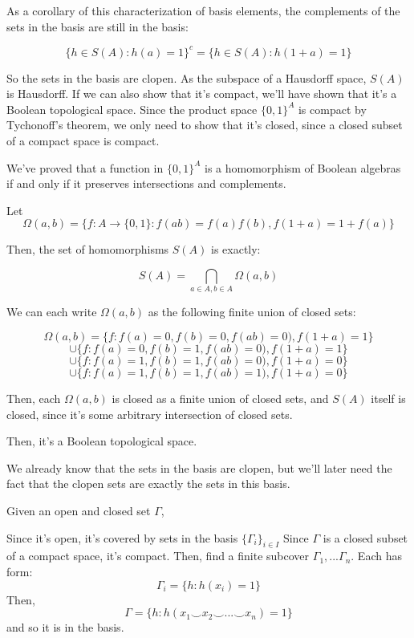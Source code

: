 \documentclass{article}
\begin{document}
      As a corollary of this characterization of basis elements, the complements
      of the sets in the basis are still in the basis:

      \[\{h \in S(A) : h(a) = 1\}^c = \{h \in S(A) : h(1+a) = 1\}\]

      So the sets in the basis are clopen.  As the subspace of a Hausdorff
      space, $S(A)$ is Hausdorff.  If we can also show that it's compact, we'll
      have shown that it's a Boolean topological space.  Since the product space
      $\{0,1\}^A$ is compact by Tychonoff's theorem, we only need to show that
      it's closed, since a closed subset of a compact space is compact.

      We've proved that a function in $\{0,1\}^A$ is a homomorphism of Boolean
      algebras if and only if it preserves intersections and complements.

      Let \[\Omega(a,b) = \{ f: A \rightarrow \{0,1\} : f(ab) = f(a)f(b), f(1+a)
      = 1 + f(a)\}\]

      Then, the set of homomorphisms $S(A)$ is exactly:

      \[S(A) = \bigcap_{a \in A, b \in A} \Omega(a,b)\]

      We can each write $\Omega(a,b)$ as the following finite union of closed
      sets:

      \[\Omega(a,b) = \{f : f(a) = 0, f(b) = 0, f(ab) = 0), f(1+a) = 1\}\]
      \[\cup \{f : f(a) = 0, f(b) = 1, f(ab) = 0), f(1+a) = 1\}\] \[\cup \{f :
      f(a) = 1, f(b) = 1, f(ab) = 0), f(1+a) = 0\}\] \[\cup \{f : f(a) = 1, f(b)
      = 1, f(ab) = 1), f(1+a) = 0\}\]

      Then, each $\Omega(a,b)$ is closed as a finite union of closed sets, and
      $S(A)$ itself is closed, since it's some arbitrary intersection of closed
      sets.

      Then, it's a Boolean topological space.

      We already know that the sets in the basis are clopen, but we'll later
      need the fact that the clopen sets are exactly the sets in this basis.

      Given an open and closed set $\Gamma$,

      Since it's open, it's covered by sets in the basis $\{\Gamma_i\}_{i \in
      I}$ Since $\Gamma$ is a closed subset of a compact space, it's compact.
      Then, find a finite subcover $\Gamma_1, ... \Gamma_n$. Each has form:
      \[\Gamma_i = \{h: h(x_i) = 1\}\] Then, \[\Gamma = \{h: h(x_1 \smile x_2
      \smile ... \smile x_n) = 1\}\] and so it is in the basis.
\end{document}
